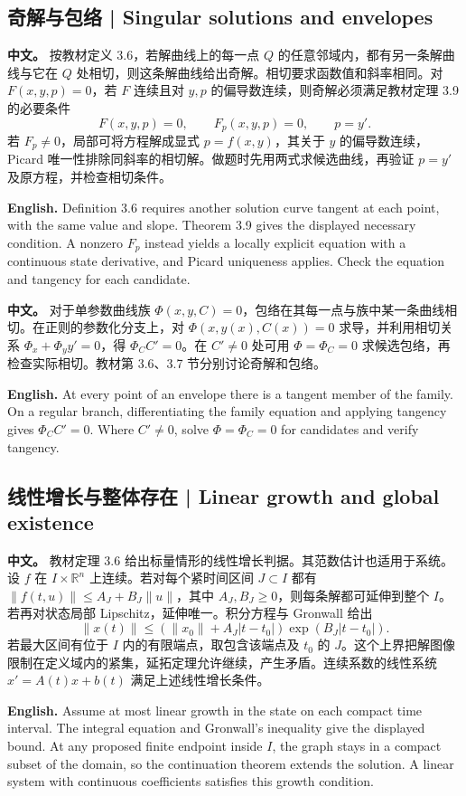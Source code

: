 \documentclass[UTF8,11pt,a4paper]{ctexart}
\newcommand{\APS}[2]{\par\noindent\textbf{中文。} #1\par\noindent\textbf{English.} #2\par}
\begin{document}
\subsection{奇解与包络 | Singular solutions and envelopes}
\APS{按教材定义 3.6，若解曲线上的每一点 $Q$ 的任意邻域内，都有另一条解曲线与它在 $Q$ 处相切，则这条解曲线给出奇解。相切要求函数值和斜率相同。对 $F(x,y,p)=0$，若 $F$ 连续且对 $y,p$ 的偏导数连续，则奇解必须满足教材定理 3.9 的必要条件
\[
F(x,y,p)=0,\qquad F_p(x,y,p)=0,\qquad p=y'.
\]
若 $F_p\ne0$，局部可将方程解成显式 $p=f(x,y)$，其关于 $y$ 的偏导数连续，Picard 唯一性排除同斜率的相切解。做题时先用两式求候选曲线，再验证 $p=y'$ 及原方程，并检查相切条件。}{Definition 3.6 requires another solution curve tangent at each point, with the same value and slope. Theorem 3.9 gives the displayed necessary condition. A nonzero $F_p$ instead yields a locally explicit equation with a continuous state derivative, and Picard uniqueness applies. Check the equation and tangency for each candidate.}
\APS{对于单参数曲线族 $\Phi(x,y,C)=0$，包络在其每一点与族中某一条曲线相切。在正则的参数化分支上，对 $\Phi(x,y(x),C(x))=0$ 求导，并利用相切关系 $\Phi_x+\Phi_y y'=0$，得 $\Phi_C C'=0$。在 $C'\ne0$ 处可用 $\Phi=\Phi_C=0$ 求候选包络，再检查实际相切。教材第 3.6、3.7 节分别讨论奇解和包络。}{At every point of an envelope there is a tangent member of the family. On a regular branch, differentiating the family equation and applying tangency gives $\Phi_C C'=0$. Where $C'\ne0$, solve $\Phi=\Phi_C=0$ for candidates and verify tangency.}

\subsection{线性增长与整体存在 | Linear growth and global existence}
\APS{教材定理 3.6 给出标量情形的线性增长判据。其范数估计也适用于系统。设 $f$ 在 $I\times\mathbb R^n$ 上连续。若对每个紧时间区间 $J\subset I$ 都有 $\|f(t,u)\|\le A_J+B_J\|u\|$，其中 $A_J,B_J\ge0$，则每条解都可延伸到整个 $I$。若再对状态局部 Lipschitz，延伸唯一。积分方程与 Gronwall 给出
\[
\|x(t)\|\le(\|x_0\|+A_J|t-t_0|)\exp(B_J|t-t_0|).
\]
若最大区间有位于 $I$ 内的有限端点，取包含该端点及 $t_0$ 的 $J$。这个上界把解图像限制在定义域内的紧集，延拓定理允许继续，产生矛盾。连续系数的线性系统 $x'=A(t)x+b(t)$ 满足上述线性增长条件。}{Assume at most linear growth in the state on each compact time interval. The integral equation and Gronwall's inequality give the displayed bound. At any proposed finite endpoint inside $I$, the graph stays in a compact subset of the domain, so the continuation theorem extends the solution. A linear system with continuous coefficients satisfies this growth condition.}
\end{document}
